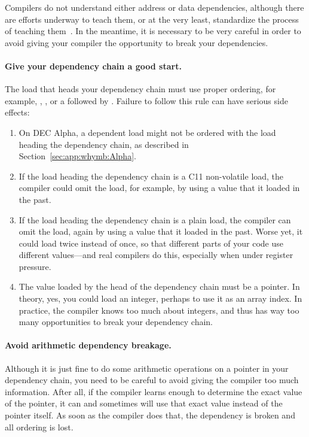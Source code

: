 Compilers do not understand either address or data dependencies,
although there are efforts underway to teach them, or at the very
least, standardize the process of teaching
them~\cite{PaulEMcKennneyConsumeP0190R0,PaulEMcKenney2017markconsumeP0461R1}.
In the meantime, it is necessary to be very careful in order to avoid
giving your compiler the opportunity to break your dependencies.

\paragraph{Give your dependency chain a good start.}
The load that heads your dependency chain must use proper
ordering, for example, ,
, or
a  followed by .
Failure to follow this rule can have serious side effects:

\begin{enumerate}
\item	On DEC Alpha, a dependent load might not be ordered with
	the load heading the dependency chain, as described in
	Section~\ref{sec:app:whymb:Alpha}.
\item	If the load heading the dependency chain is a
	C11 non-volatile  load,
	the compiler could omit the load, for example, by using a value
	that it loaded in the past.
\item	If the load heading the dependency chain is a plain load,
	the compiler can omit the load, again by using a value
	that it loaded in the past.
	Worse yet, it could load twice instead of once, so that
	different parts of your code use different values---and
	real compilers do this, especially when under register
	pressure.
\item	The value loaded by the head of the dependency chain must
	be a pointer.
	In theory, yes, you could load an integer, perhaps to use
	it as an array index.
	In practice, the compiler knows too much about integers,
	and thus has way too many opportunities to break your
	dependency chain.
\end{enumerate}

\paragraph{Avoid arithmetic dependency breakage.}
Although it is just fine to do some arithmetic operations on a pointer in
your dependency chain, you need to be careful to avoid giving the
compiler too much information.
After all, if the compiler learns enough to determine the exact value
of the pointer, it can and sometimes will use that exact value instead
of the pointer itself.
As soon as the compiler does that, the dependency is broken and all
ordering is lost.

